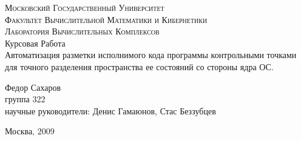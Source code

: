 \begin{titlepage}
	\begin{center}
	\textsc{\large{Московский Государственный Университет}
	\\[.5cm]
	\normalsize{Факультет Вычислительной Математики и Кибернетики\\
	Лаборатория Вычислительных Комплексов}}
	\\[4cm]

	\large{Курсовая Работа }\\[1.5cm]

	{\Large {Автоматизация разметки исполнимого кода программы 
	контрольными точками для точного разделения пространства 
	ее состояний со стороны ядра ОС.}} \\[3cm]
	\begin{flushright}
		Федор Сахаров\\
		группа 322\\
		научные руководители: Денис Гамаюнов, Стас Беззубцев
	\end{flushright}
	\vfill
	
	Москва, 2009
	\end{center}

\end{titlepage}

